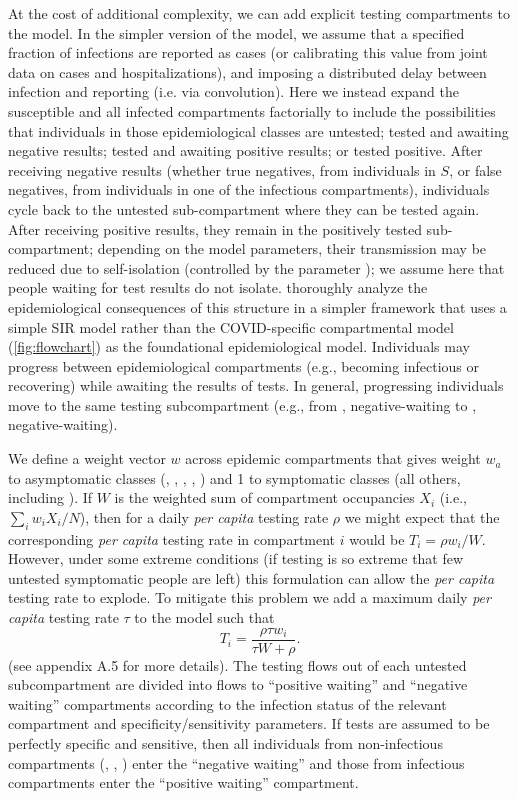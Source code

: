 \documentclass[12pt]{article}\usepackage[]{graphicx}\usepackage[]{color}
\begin{document}
At the cost of additional complexity, we can add explicit testing compartments to the model.
In the simpler version of the model, we assume that a specified fraction of infections are reported as cases (or calibrating this value from joint data on cases and hospitalizations), and imposing a distributed delay between infection and reporting (i.e. via convolution).
Here we instead expand the susceptible and all infected compartments factorially to include the possibilities that individuals in those epidemiological classes are untested; tested and awaiting negative results; tested and awaiting positive results; or tested positive.
After receiving negative results (whether true negatives, from individuals in $S$, or false negatives, from individuals in one of the infectious compartments), individuals cycle back to the untested sub-compartment where they can be tested again. After receiving positive results, they remain in the positively tested sub-compartment; depending on the model parameters, their transmission may be reduced due to self-isolation (controlled by the parameter ); we assume here that people waiting for test results do not isolate.
\cite{Ghar+22} thoroughly analyze the epidemiological consequences of this structure in a simpler framework that uses a simple SIR model rather than the COVID-specific compartmental model (\cref{fig:flowchart}) as the foundational epidemiological model.
Individuals may progress between epidemiological compartments (e.g., becoming infectious or recovering) while awaiting the results of tests. In general, progressing individuals move to the same testing subcompartment (e.g., from , negative-waiting to , negative-waiting).

We define a weight vector $w$ across epidemic compartments that gives weight $w_a$ to asymptomatic classes (, , , , ) and 1 to symptomatic classes (all others, including  ).
If $W$ is the weighted sum of compartment occupancies $X_i$ (i.e., $\sum_i w_i X_i/N$), then for a daily \emph{per capita} testing rate $\rho$ we might expect that the corresponding \emph{per capita} testing rate in compartment $i$ would be $T_i = \rho w_i/W$. 
However, under some extreme conditions (if testing is so extreme that few untested symptomatic people are left) this formulation can allow the \emph{per capita} testing rate to explode. To mitigate this problem we add a maximum daily \emph{per capita} testing rate $\tau$ to the model such that
\[T_i = \frac{\rho \tau w_i}{\tau W + \rho} .\] (see \cite{Ghar+22} appendix A.5 for more details).
The testing flows out of each untested subcompartment are divided into flows to ``positive waiting'' and ``negative waiting'' compartments according to the infection status of the relevant compartment and specificity/sensitivity parameters. If tests are assumed to be perfectly specific and sensitive, then all individuals from non-infectious compartments (, , ) enter the ``negative waiting'' and those from infectious compartments enter the ``positive waiting'' compartment.
\end{document}
